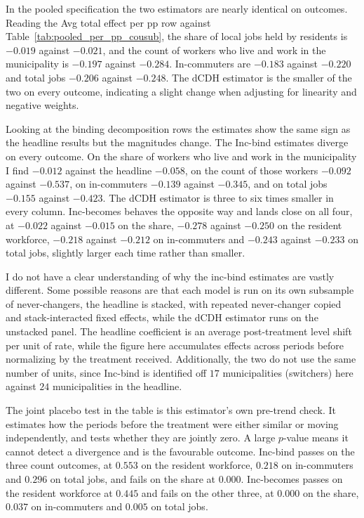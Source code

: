 \documentclass[12pt]{article}
\begin{document}

In the pooled specification the two estimators are nearly identical on outcomes. Reading the Avg total effect per pp row against
Table~\ref{tab:pooled_per_pp_cousub}, the share of local jobs held by
residents is $-0.019$ against $-0.021$, and the count of workers who live
and work in the municipality is $-0.197$ against $-0.284$. In-commuters
are $-0.183$ against $-0.220$ and total jobs $-0.206$ against $-0.248$.
The dCDH estimator is the smaller of the two on every outcome, indicating a slight change when adjusting for linearity and negative weights. 

Looking at the binding decomposition rows the estimates show the same sign
as the headline results but the magnitudes change. The Inc-bind estimates
diverge on every outcome. On the share of workers who live and work in the
municipality I find $-0.012$ against the headline $-0.058$, on the count
of those workers $-0.092$ against $-0.537$, on in-commuters $-0.139$
against $-0.345$, and on total jobs $-0.155$ against $-0.423$. The
dCDH estimator is three to six times smaller in every column.
Inc-becomes behaves the opposite way and lands close on all four, at
$-0.022$ against $-0.015$ on the share, $-0.278$ against $-0.250$ on the
resident workforce, $-0.218$ against $-0.212$ on in-commuters and $-0.243$
against $-0.233$ on total jobs, slightly larger each time rather than
smaller.

I do not have a clear understanding of why the inc-bind estimates are vastly different. Some possible reasons are that each model is
run on its own subsample of never-changers, the headline is stacked, with
repeated never-changer copied and stack-interacted fixed effects, while
the dCDH estimator runs on the unstacked panel. The headline coefficient is an
average post-treatment level shift per unit of rate, while the figure here
accumulates effects across periods before normalizing by the treatment
received. Additionally, the two do not use the same number of units, since Inc-bind is
identified off $17$ municipalities (switchers) here against $24$ municipalities in the
headline.

The joint placebo test in the table is this estimator's own pre-trend
check. It estimates how the periods before the treatment were either similar or moving independently, and tests whether they are jointly zero.
A large $p$-value means it cannot detect a divergence and is the
favourable outcome. Inc-bind passes on the three count outcomes, at
$0.553$ on the resident workforce, $0.218$ on in-commuters and $0.296$ on
total jobs, and fails on the share at $0.000$. Inc-becomes passes on the
resident workforce at $0.445$ and fails on the other three, at $0.000$ on
the share, $0.037$ on in-commuters and $0.005$ on total jobs.
\end{document}
